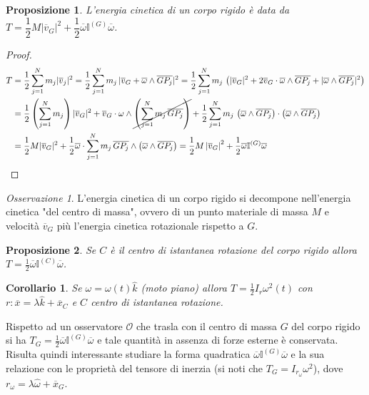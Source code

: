 \documentclass{book}
\theoremstyle{plain}
\theoremstyle{plain}
\theoremstyle{plain}
\theoremstyle{plain}
\newtheorem*{cor}{Corollario}
\theoremstyle{plain}
\newtheorem{prop}{Proposizione}[chapter]
\theoremstyle{definition}
\theoremstyle{remark}
\newtheorem*{oss}{Osservazione}
\theoremstyle{definition}
\begin{document}
\begin{prop}
    L'energia cinetica di un corpo rigido è data da $T=\dfrac{1}{2}M\left|\overline{v}_G\right|^2 + \dfrac{1}{2}\overline{\omega}\mathbb{I}^{(G)}\overline{\omega}$.
\end{prop}

\begin{proof}
    \[
    \begin{split}
        T&=\frac{1}{2}\sum_{j=1}^Nm_j|\overline{v}_j|^2=\frac{1}{2}\sum_{j=1}^Nm_j\,|\overline{v}_G+\overline{\omega}\wedge\overline{GP_j}|^2=\frac{1}{2}\sum_{j=1}^Nm_j\,\left(|\overline{v}_G|^2+2\overline{v}_G\cdot\overline{\omega}\wedge\overline{GP_j}+|\overline{\omega}\wedge\overline{GP_j}|^2\right) \\
        &=\frac{1}{2}\left(\sum_{j=1}^Nm_j\right)|\overline{v}_G|^2+\overline{v}_G\cdot\omega\wedge\cancel{\left(\sum_{j=1}^Nm_j\,\overline{GP_j}\right)}+\frac{1}{2}\sum_{j=1}^Nm_j\,\left(\overline{\omega}\wedge\overline{GP_j}\right)\cdot\left(\overline{\omega}\wedge\overline{GP_j}\right) \\
        &=\frac{1}{2}M|\overline{v}_G|^2+\frac{1}{2}\overline{\omega}\cdot\sum_{j=1}^Nm_j\,\overline{GP_j}\wedge\left(\overline{\omega}\wedge\overline{GP_j}\right)=\frac{1}{2}M\left|\overline{v}_G\right|^2 + \dfrac{1}{2}\overline{\omega}\mathbb{I}^{(G)}\overline{\omega}
    \end{split}
    \]
\end{proof}

\begin{oss}
    L'energia cinetica di un corpo rigido si decompone nell'energia cinetica "del centro di massa", ovvero di un punto materiale di massa $M$ e velocità $\overline{v}_G$ più l'energia cinetica rotazionale rispetto a $G$.
\end{oss}

\begin{prop}
    Se $C$ è il centro di istantanea rotazione del corpo rigido allora $T=\frac{1}{2}\overline{\omega}\mathbb{I}^{(C)}\overline{\omega}$.
\end{prop}

\begin{cor}
    Se $\omega=\omega(t)\hat{k}$ (moto piano) allora $T=\frac{1}{2}I_r\omega^2(t)$ con $r: \overline{x}=\lambda\hat{k}+\overline{x}_{C}$ e $C$ centro di istantanea rotazione.
\end{cor}

\noindent Rispetto ad un osservatore $\mathcal{O}$ che trasla con il centro di massa $G$ del corpo rigido si ha $T_G=\frac{1}{2}\overline{\omega}\mathbb{I}^{(G)}\overline{\omega}$ e tale quantità in assenza di forze esterne è conservata. Risulta quindi interessante studiare la forma quadratica $\overline{\omega}\mathbb{I}^{(G)}\overline{\omega}$ e la sua relazione con le proprietà del tensore di inerzia (si noti che $T_G=I_{r_{\omega}}\omega^2$), dove $r_{\omega}=\lambda\hat{\omega}+\overline{x}_G$.
\end{document}
